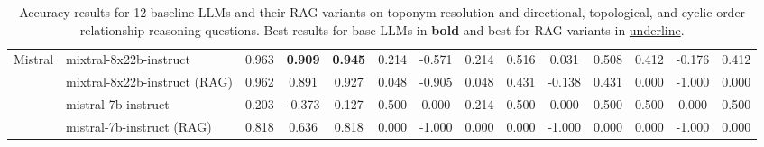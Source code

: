 \begin{table*}[ht]
\begin{tabular}{r|lccc|ccc|ccc|ccc}
        Mistral & mixtral-8x22b-instruct       & 0.963 & \textbf{0.909}  & \textbf{0.945} & 0.214 & -0.571 & 0.214 & 0.516 & 0.031 & 0.508 & 0.412 & -0.176 & 0.412\\ 
         ~      & mixtral-8x22b-instruct (RAG) & 0.962 & 0.891 & 0.927 & 0.048 & -0.905 & 0.048 & 0.431 & -0.138 & 0.431   & 0.000 & -1.000 & 0.000 \\ 
        ~       & mistral-7b-instruct          & 0.203 & -0.373 & 0.127 & 0.500 & 0.000  & 0.214 & 0.500 & 0.000 & 0.500 & 0.500 & 0.000  & 0.500 \\ 
         ~      & mistral-7b-instruct (RAG)    & 0.818 & 0.636 & 0.818 & 0.000 & -1.000 & 0.000 & 0.000 & -1.000 & 0.000 & 0.000 & -1.000 & 0.000 \\ 
    \hline
    \hline
    \end{tabular}
    \caption{Accuracy results for 12 baseline LLMs and their RAG variants on toponym resolution and directional, topological, and cyclic order relationship reasoning questions. Best results for base LLMs in \textbf{bold} and best for RAG variants in \underline{underline}. }
    \label{tab:models}
\end{table*}

\endgroup